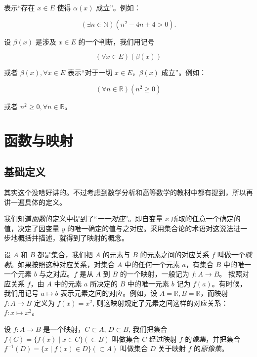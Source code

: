 \documentclass[lang=cn,10pt]{template}
\begin{document}
表示“存在 $x \in E$ 使得 $\alpha(x)$ 成立”。例如：

\begin{equation*}
  (\exists n \in \mathbb{N})(n^2 -4n + 4 > 0).
\end{equation*}

设 $\beta(x)$ 是涉及 $x \in E$ 的一个判断，我们用记号

\begin{equation*}
  (\forall x \in E)(\beta(x))
\end{equation*}

或者 $\beta(x), \forall x \in E$ 表示“对于一切 $x \in E$，$\beta(x)$ 成立”。例如：

\begin{equation*}
  (\forall n \in \mathbb{R})(n^2 \geq 0)
\end{equation*}

或者 $n^2 \geq 0, \forall n \in \mathbb{R}$。

\section{函数与映射}

\subsection{基础定义}

其实这个没啥好讲的。不过考虑到数学分析和高等数学的教材中都有提到，所以再讲一遍具体的定义。

我们知道\emph{函数}的定义中提到了“\emph{一一对应}”。即自变量 $x$ 所取的任意一个确定的值，决定了因变量 $y$ 的唯一确定的值与之对应。采用集合论的术语对这说法进一步地概括并描述，就得到了映射的概念。

设 $A$ 和 $B$ 都是集合，我们把 $A$ 的元素与 $B$ 的元素之间的对应关系 $f$ 叫做一个\emph{映射}。如果按照这种对应关系，对集合 $A$ 中的任何一个元素 $a$，有集合 $B$ 中的唯一一个元素 $b$ 与之对应。$f$ 是从 $A$ 到 $B$ 的一个映射，一般记为 $f:A\rightarrow B$。
按照对应关系 $f$，由 $A$ 中的元素 $a$ 所决定的 $B$ 中的唯一元素 $b$ 记为 $f(a)$。有时候，我们用记号 $a \mapsto b$ 表示元素之间的对应。例如，设 $A=\mathbb R, B = \mathbb R$，而映射 $f: A \rightarrow B$ 定义为 $f(x) = x^2$, 则这映射规定了元素之间这样的对应关系：$f: x \mapsto x^2$。


设 $f:A\rightarrow B$ 是一个映射，$C \subset A$, $D \subset B$, 我们把集合 $f(C)=\{f(x) \mid x \in C\}(\subset B)$ 叫做集合 $C$ 经过映射 $f$ 的\emph{像集}，并把集合 $f^{-1}(D)=\{x \mid f(x) \in D\}(\subset A)$ 叫做集合 $D$ 关于映射 $f$ 的\emph{原像集}。
\end{document}

